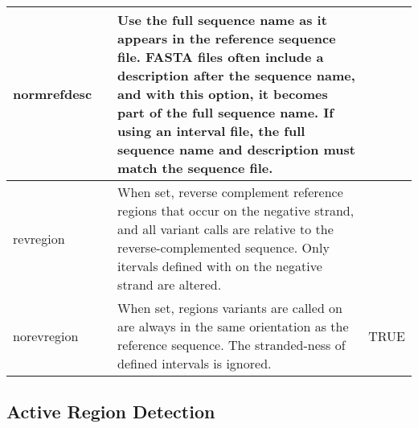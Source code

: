 \begin{small}
\begin{longtable}{|p{\optwidth}|p{\argwidth}|p{\dscwidth}|p{}|}
		\ddash{}normrefdesc & &
		Use the full sequence name as it appears in the reference sequence file. FASTA files often include a description after the sequence name, and with this option, it becomes part of the full sequence name. If using an interval file, the full sequence name and description must match the sequence file.
		&
		\\ \hline
		
		\ddash{}revregion & &
		When set, reverse complement reference regions that occur on the negative strand, and all variant calls are relative to the reverse-complemented sequence. Only itervals defined with on the negative strand are altered.
		&
		\\ \hline
		
		\ddash{}norevregion & &
		When set, regions variants are called on are always in the same orientation as the reference sequence. The stranded-ness of defined intervals is ignored.
		& TRUE
		\\ \hline
		
	\end{longtable}
\end{small}



\subsection{Active Region Detection}
\label{sec.cmdline.opts.ardetect}

